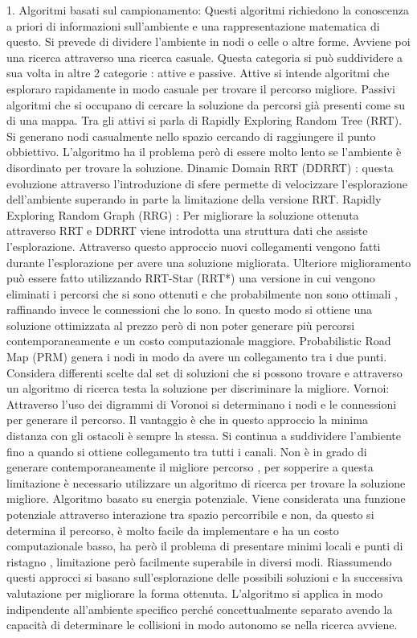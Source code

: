 \begin{idee}
	1. Algoritmi basati sul campionamento:
		Questi algoritmi richiedono la conoscenza a priori di informazioni sull'ambiente e una rappresentazione matematica di questo. Si prevede di dividere l'ambiente in nodi o celle o altre forme. Avviene poi una ricerca attraverso una ricerca casuale. Questa categoria si può suddividere a sua volta in altre 2 categorie : attive e passive. Attive  si intende algoritmi che esploraro rapidamente in modo casuale per trovare il percorso migliore. Passivi algoritmi che si occupano di cercare la soluzione da percorsi già presenti come su di una mappa.
		Tra gli attivi si parla di Rapidly Exploring Random Tree (RRT). Si generano nodi casualmente nello spazio cercando di raggiungere il punto obbiettivo. L'algoritmo ha il problema però di essere molto lento se l'ambiente è disordinato per trovare la soluzione.
		Dinamic Domain RRT (DDRRT) : questa evoluzione attraverso l'introduzione di sfere permette di velocizzare l'esplorazione dell'ambiente superando in parte la limitazione della versione RRT.
		Rapidly Exploring Random Graph (RRG) : Per migliorare la soluzione ottenuta attraverso RRT e DDRRT viene introdotta una struttura dati che assiste l'esplorazione. Attraverso questo approccio nuovi collegamenti vengono fatti durante l'esplorazione per avere una soluzione migliorata. Ulteriore miglioramento può essere fatto utilizzando RRT-Star (RRT*) una versione in cui vengono eliminati i percorsi che si sono ottenuti e che probabilmente non sono ottimali , raffinando invece le connessioni che lo sono. In questo modo si ottiene una soluzione ottimizzata al prezzo però di non poter generare più percorsi contemporaneamente e un costo computazionale maggiore.
		Probabilistic Road Map (PRM) genera i nodi in modo da avere un collegamento tra i due punti. Considera differenti scelte dal set di soluzioni che si possono trovare e attraverso un algoritmo di ricerca testa la soluzione per discriminare la migliore.
		Vornoi: Attraverso l'uso dei digrammi di Voronoi si determinano i nodi e le connessioni per generare il percorso. Il vantaggio è che in questo approccio la minima distanza con gli ostacoli è sempre la stessa. Si continua a suddividere l'ambiente fino a quando si ottiene collegamento tra tutti i canali. Non è in grado di generare contemporaneamente il migliore percorso , per sopperire a questa limitazione è necessario utilizzare un algoritmo di ricerca per trovare la soluzione migliore.
		Algoritmo basato su energia potenziale. Viene considerata una funzione potenziale attraverso interazione tra spazio percorribile e non, da questo si determina il percorso, è molto facile da implementare e ha un costo computazionale basso, ha però il problema di presentare minimi locali e punti di ristagno , limitazione però facilmente superabile in diversi modi.
		Riassumendo questi approcci si basano sull'esplorazione delle possibili soluzioni e la successiva valutazione per migliorare la forma ottenuta. L'algoritmo si applica in modo indipendente all'ambiente specifico perché concettualmente separato avendo la capacità di determinare le collisioni in modo autonomo se nella ricerca avviene.
	

\end{idee}
